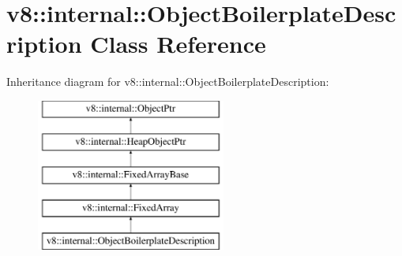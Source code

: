 \hypertarget{classv8_1_1internal_1_1ObjectBoilerplateDescription}{}\section{v8\+:\+:internal\+:\+:Object\+Boilerplate\+Description Class Reference}
\label{classv8_1_1internal_1_1ObjectBoilerplateDescription}
Inheritance diagram for v8\+:\+:internal\+:\+:Object\+Boilerplate\+Description\+:\begin{figure}[H]
\begin{center}
\leavevmode
\includegraphics[height=5.000000cm]{classv8_1_1internal_1_1ObjectBoilerplateDescription}
\end{center}
\end{figure}

